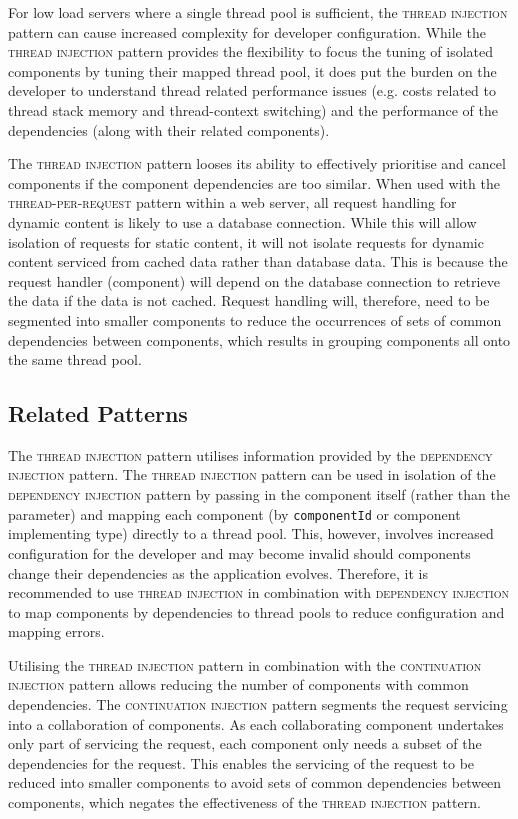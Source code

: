 \documentclass[prodmode]{style/acmlarge}
\begin{document}
For low load servers where a single thread pool is sufficient, the
\textsc{thread injection} pattern can cause increased complexity for developer
configuration.  While the \textsc{thread injection} pattern provides the
flexibility to focus the tuning of isolated components by tuning their mapped
thread pool, it does put the burden on the developer to understand thread
related performance issues (e.g. costs related to thread stack memory and
thread-context switching) and the performance of the dependencies (along with
their related components).

The \textsc{thread injection} pattern looses its ability to effectively
prioritise and cancel components if the component dependencies are too similar. 
When used with the \textsc{thread-per-request} pattern within a web server, all
request handling for dynamic content is likely to use a database connection. 
While this will allow isolation of requests for static content, it will not
isolate requests for dynamic content serviced from cached data rather than
database data.  This is because the request handler (component) will depend on
the database connection to retrieve the data if the data is not cached.  Request
handling will, therefore, need to be segmented into smaller components to reduce
the occurrences of sets of common dependencies between components, which results
in grouping components all onto the same thread pool.


\subsection{Related Patterns}

The \textsc{thread injection} pattern utilises information provided by the
\textsc{dependency injection} pattern.  The \textsc{thread injection} pattern
can be used in isolation of the \textsc{dependency injection} pattern by passing
in the component itself (rather than the parameter) and mapping each component
(by \texttt{componentId} or component implementing type) directly to a thread
pool.  This, however, involves increased configuration for the developer and may
become invalid should components change their dependencies as the application
evolves.  Therefore, it is recommended to use \textsc{thread injection} in
combination with \textsc{dependency injection} to map components by dependencies
to thread pools to reduce configuration and mapping errors.

Utilising the \textsc{thread injection} pattern in combination with the
\textsc{continuation injection} pattern allows reducing the number of components
with common dependencies.  The \textsc{continuation injection} pattern segments
the request servicing into a collaboration of components.  As each collaborating
component undertakes only part of servicing the request, each component only
needs a subset of the dependencies for the request.  This enables the servicing
of the request to be reduced into smaller components to avoid sets of common
dependencies between components, which negates the effectiveness of the
\textsc{thread injection} pattern.
\end{document}

